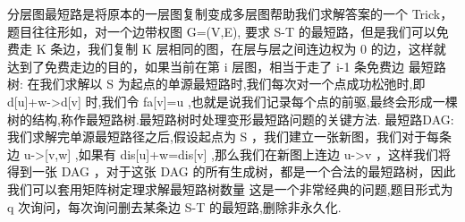 \markdownRendererInterblockSeparator
{}分层图最短路是将原本的一层图复制变成多层图帮助我们求解答案的一个 \markdownRendererDollarSign{}Trick\markdownRendererDollarSign{}，题目往往形如，对一个边带权图 \markdownRendererDollarSign{}G=(V,E)\markdownRendererDollarSign{}, 要求 \markdownRendererDollarSign{}S-T\markdownRendererDollarSign{} 的最短路，但是我们可以免费走 \markdownRendererDollarSign{}K\markdownRendererDollarSign{} 条边，我们复制 \markdownRendererDollarSign{}K\markdownRendererDollarSign{} 层相同的图，在层与层之间连边权为 \markdownRendererDollarSign{}0\markdownRendererDollarSign{} 的边，这样就达到了免费走边的目的，如果当前在第 \markdownRendererDollarSign{}i\markdownRendererDollarSign{} 层图，相当于走了 \markdownRendererDollarSign{}i-1\markdownRendererDollarSign{} 条免费边\markdownRendererInterblockSeparator
{}
\markdownRendererSectionEnd \markdownRendererSectionBegin
{}\markdownRendererInterblockSeparator
{}最短路树:\markdownRendererParagraphSeparator
{}在我们求解以\markdownRendererDollarSign{} S \markdownRendererDollarSign{}为起点的单源最短路时,我们每次对一个点成功松弛时,即\markdownRendererDollarSign{} d[u]+w->d[v] \markdownRendererDollarSign{}时,我们令\markdownRendererDollarSign{} fa[v]=u \markdownRendererDollarSign{},也就是说我们记录每个点的前驱,最终会形成一棵树的结构,称作最短路树.最短路树时处理变形最短路问题的关键方法.\markdownRendererParagraphSeparator
{}最短路DAG:\markdownRendererParagraphSeparator
{}我们求解完单源最短路径之后,假设起点为\markdownRendererDollarSign{} S \markdownRendererDollarSign{}，我们建立一张新图，我们对于每条边\markdownRendererDollarSign{} u->[v,w] \markdownRendererDollarSign{},如果有\markdownRendererDollarSign{} dis[u]+w=dis[v] \markdownRendererDollarSign{},那么我们在新图上连边\markdownRendererDollarSign{} u->v \markdownRendererDollarSign{}，这样我们将得到一张\markdownRendererDollarSign{} DAG \markdownRendererDollarSign{}，对于这张\markdownRendererDollarSign{} DAG \markdownRendererDollarSign{}的所有生成树，都是一个合法的最短路树，因此我们可以套用矩阵树定理求解最短路树数量\markdownRendererInterblockSeparator
{}
\markdownRendererSectionEnd \markdownRendererSectionBegin
{}\markdownRendererInterblockSeparator
{}这是一个非常经典的问题,题目形式为\markdownRendererDollarSign{} q \markdownRendererDollarSign{}次询问，每次询问删去某条边\markdownRendererDollarSign{} S-T \markdownRendererDollarSign{}的最短路,删除非永久化.\markdownRendererParagraphSeparator
